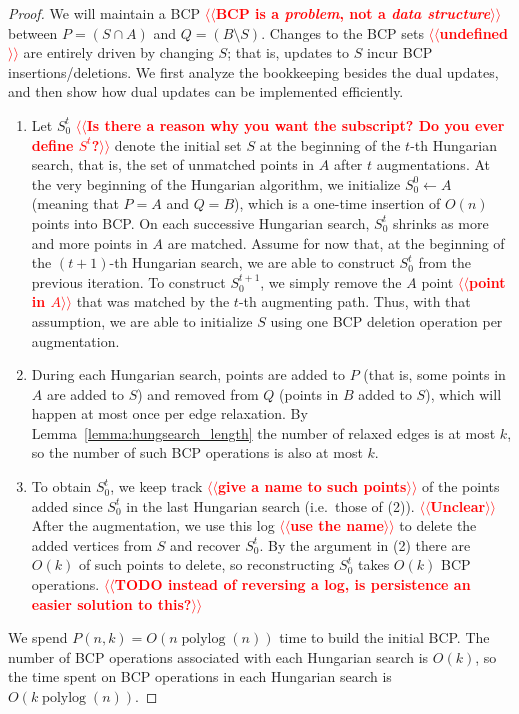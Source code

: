 \documentclass[11pt]{article}
\makeatletter
\def\polylog{\mathop{\mathrm{polylog}}}
\theoremstyle{plain}
\def\n@te#1{\textsf{\boldmath \textbf{$\langle\!\langle$#1$\rangle\!\rangle$}}\leavevmode}
\def\note#1{\textcolor{red}{\n@te{#1}}}
\makeatother
\begin{document}
\begin{proof}
We will maintain a BCP \note{BCP is a \emph{problem}, not a \emph{data structure}} between $P = (S \cap A)$ and
$Q = (B \setminus S)$.
Changes to the BCP sets \note{undefined} are entirely driven by changing $S$; that is, updates to $S$ incur BCP insertions/deletions.
We first analyze the bookkeeping besides the dual updates, and then
show how dual updates can be implemented efficiently.

\begin{enumerate}
\item Let $S^t_0$ \note{Is there a reason why you want the subscript?  Do you ever define $S^t$?} denote the initial set $S$ at the beginning of the
	$t$-th Hungarian search, that is, the set of unmatched points in $A$
	after $t$ augmentations.
	At the very beginning of the Hungarian algorithm, we initialize
	$S^0_0 \gets A$ (meaning that $P = A$ and $Q = B$), which is a
	one-time insertion of $O(n)$ points into BCP.
	On each successive Hungarian search, $S^t_0$ shrinks as more
	and more points in $A$ are matched.
	Assume for now that, at the beginning of the $(t+1)$-th
	Hungarian search, we are able to construct $S^t_0$ from the
	previous iteration.
	To construct $S^{t+1}_0$, we simply remove the $A$ point \note{point in $A$} that
	was matched by the $t$-th augmenting path.
	Thus, with that assumption, we are able to initialize $S$ using
	one BCP deletion operation per augmentation.

\item During each Hungarian search, points are added to $P$ (that is, some points in $A$ are
	added to $S$) and removed from $Q$ (points in $B$ added to $S$), which will happen at most once per edge relaxation.
	By Lemma~\ref{lemma:hungsearch_length} the number of relaxed
	edges is at most $k$, so the number of such BCP operations is
	also at most $k$.

\item To obtain $S^t_0$, we keep track \note{give a name to such points} of the
	points added since $S^t_0$ in the last Hungarian search
	(i.e.\ those of (2)). \note{Unclear}
	After the augmentation, we use this log \note{use the name} to delete the added
	vertices from $S$ and recover $S^t_0$.
	By the argument in (2) there are $O(k)$ of such points to
	delete, so reconstructing $S^t_0$ takes $O(k)$ BCP operations.
	\note{TODO instead of reversing a log, is persistence an easier solution to this?}
\end{enumerate}

We spend $P(n, k) = O(n \polylog(n))$ time to build
the initial BCP.
The number of BCP operations associated with each Hungarian search is
$O(k)$, so the time spent on BCP operations in each Hungarian search
is $O(k \polylog(n))$.


\end{proof}
\end{document}
